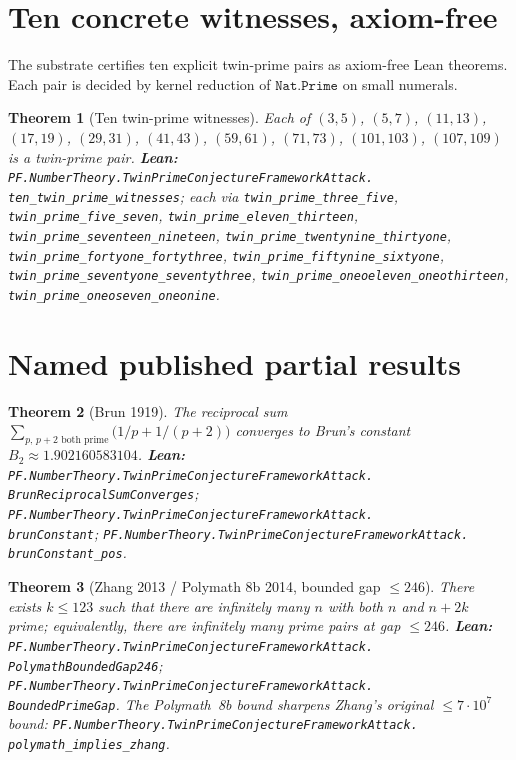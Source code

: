 \documentclass[11pt,a4paper]{article}
\theoremstyle{plain}
\newtheorem{theorem}{Theorem}[section]
\theoremstyle{definition}
\begin{document}
\section{Ten concrete witnesses, axiom-free}
\label{sec:witnesses}

The substrate certifies ten explicit twin-prime pairs as axiom-free
Lean theorems. Each pair is decided by kernel reduction of
$\mathtt{Nat.Prime}$ on small numerals.

\begin{theorem}[Ten twin-prime witnesses]
\label{thm:ten-witnesses}
Each of $(3,5)$, $(5,7)$, $(11,13)$, $(17,19)$, $(29,31)$, $(41,43)$,
$(59,61)$, $(71,73)$, $(101,103)$, $(107,109)$ is a twin-prime pair.
\textbf{Lean:}
\texttt{PF.NumberTheory.TwinPrimeConjectureFrameworkAttack.\\
ten\_twin\_prime\_witnesses};
each via \texttt{twin\_prime\_three\_five},
\texttt{twin\_prime\_five\_seven},
\texttt{twin\_prime\_eleven\_thirteen},
\texttt{twin\_prime\_seventeen\_nineteen},
\texttt{twin\_prime\_twentynine\_thirtyone},
\texttt{twin\_prime\_fortyone\_fortythree},
\texttt{twin\_prime\_fiftynine\_sixtyone},
\texttt{twin\_prime\_seventyone\_seventythree},
\texttt{twin\_prime\_oneoeleven\_oneothirteen},
\texttt{twin\_prime\_oneoseven\_oneonine}.
\end{theorem}

\section{Named published partial results}
\label{sec:named}

\begin{theorem}[Brun 1919]
\label{thm:brun}
The reciprocal sum $\sum_{p,\,p+2\text{ both prime}} \bigl(1/p +
1/(p+2)\bigr)$ converges to Brun's constant $B_{2} \approx
1.902160583104$.
\textbf{Lean:}
\texttt{PF.NumberTheory.TwinPrimeConjectureFrameworkAttack.\\
BrunReciprocalSumConverges};
\texttt{PF.NumberTheory.TwinPrimeConjectureFrameworkAttack.\\
brunConstant};
\texttt{PF.NumberTheory.TwinPrimeConjectureFrameworkAttack.\\
brunConstant\_pos}.
\end{theorem}

\begin{theorem}[Zhang 2013 / Polymath 8b 2014, bounded gap $\le 246$]
\label{thm:polymath}
There exists $k \le 123$ such that there are infinitely many $n$ with
both $n$ and $n + 2k$ prime; equivalently, there are infinitely many
prime pairs at gap $\le 246$.
\textbf{Lean:}
\texttt{PF.NumberTheory.TwinPrimeConjectureFrameworkAttack.\\
PolymathBoundedGap246};
\texttt{PF.NumberTheory.TwinPrimeConjectureFrameworkAttack.\\
BoundedPrimeGap}.
The Polymath~8b bound sharpens Zhang's original $\le 7 \cdot 10^{7}$
bound:
\texttt{PF.NumberTheory.TwinPrimeConjectureFrameworkAttack.\\
polymath\_implies\_zhang}.
\end{theorem}
\end{document}
